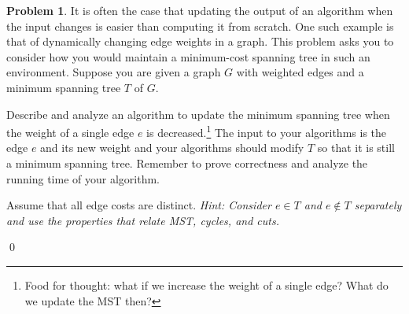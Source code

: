 \documentclass[11pt]{article}
\theoremstyle{definition}
\newtheorem{question}{Problem}
\newenvironment{solution}{\bigskip\noindent{\it Solution.}  \ignorespaces}{\hfill\qed}
\begin{document}
\newpage

\begin{question} 
It is often the case that updating the output of an algorithm when the input changes is easier than computing it from scratch.
One such example is that of dynamically changing edge weights in a graph.  This problem asks you to consider how you would maintain a minimum-cost spanning tree in
such an environment.  Suppose you are given a graph $G$ with weighted edges and a minimum spanning tree $T$ of $G$. 
		

	Describe and analyze an algorithm to update the minimum spanning tree when the weight of a single edge $e$ is decreased.\footnote{Food for thought: what if we increase the weight of a single edge? What do we update the MST then?}  
	 The input to your algorithms is the edge $e$ and its new weight and your algorithms should modify $T$ so that it is still a minimum spanning tree.  Remember to prove correctness and analyze the running time of your algorithm.
 
Assume that all edge costs are distinct. 
 {\em Hint:  Consider $e \in T$ and $e \not\in T$ separately and use the properties that relate MST, cycles, and cuts.}
\end{question}


\begin{solution}
\end{solution}

\newpage
\end{document}
